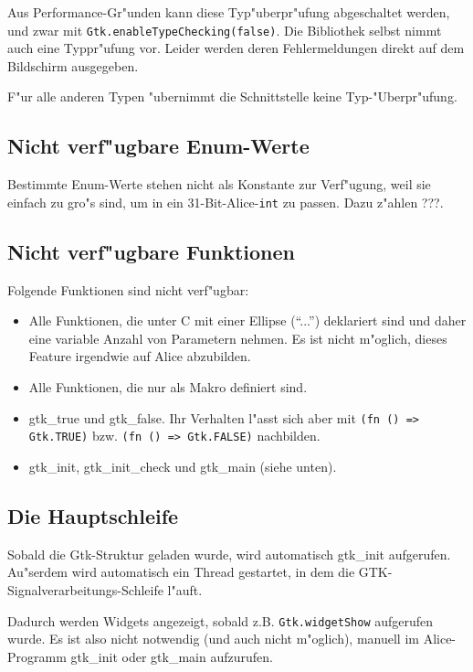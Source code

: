 \documentclass{article}
\begin{document}
Aus Performance-Gr"unden kann diese Typ"uberpr"ufung abgeschaltet werden, und
zwar mit \texttt{Gtk.enableTypeChecking(false)}. Die Bibliothek selbst nimmt
auch eine Typpr"ufung vor. Leider werden deren Fehlermeldungen direkt auf dem
Bildschirm ausgegeben.

F"ur alle anderen Typen "ubernimmt die Schnittstelle keine Typ-"Uberpr"ufung.

\subsection{Nicht verf"ugbare Enum-Werte}

Bestimmte Enum-Werte stehen nicht als Konstante zur Verf"ugung, weil sie 
einfach zu gro"s sind, um in ein 31-Bit-Alice-\texttt{int} zu passen.
Dazu z"ahlen ???.

\subsection{Nicht verf"ugbare Funktionen}

Folgende Funktionen sind nicht verf"ugbar:
\begin{itemize}
\item Alle Funktionen, die unter C mit einer Ellipse (``...'') deklariert sind
      und daher eine variable Anzahl von Parametern nehmen. Es ist nicht
      m"oglich, dieses Feature irgendwie auf Alice abzubilden.
\item Alle Funktionen, die nur als Makro definiert sind.
\item gtk\_true und gtk\_false. Ihr Verhalten l"asst sich aber mit
      \texttt{(fn () => Gtk.TRUE)} bzw. \texttt{(fn () => Gtk.FALSE)}
      nachbilden.
\item gtk\_init, gtk\_init\_check und gtk\_main (siehe unten).
\end{itemize}

\subsection{Die Hauptschleife}

Sobald die Gtk-Struktur geladen wurde, wird automatisch gtk\_init aufgerufen.
Au"serdem wird automatisch ein Thread gestartet, in dem die GTK-
Signalverarbeitungs-Schleife l"auft.

Dadurch werden Widgets angezeigt, sobald z.B. \texttt{Gtk.widgetShow}
aufgerufen wurde. Es ist also nicht notwendig (und auch nicht m"oglich), 
manuell im Alice-Programm gtk\_init oder gtk\_main aufzurufen.
\end{document}
